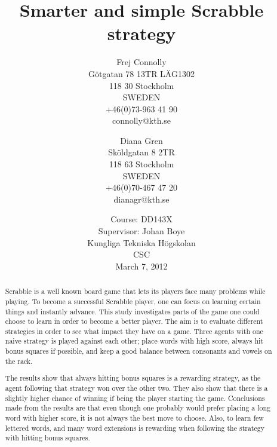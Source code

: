 \documentclass[a4paper, 12pt]{report}
\begin{document}
\graphicspath{{./images/}}
\title{Smarter and simple Scrabble strategy}
\date{Course: DD143X \\ Supervisor: Johan Boye \\ Kungliga Tekniska Högskolan \\ CSC \\ March 7, 2012}
\author{Frej Connolly \\ Götgatan 78 13TR LÄG1302 \\ 118 30 Stockholm \\ SWEDEN \\ +46(0)73-963 41 90 \\ connolly@kth.se \\
        \and Diana Gren \\ Sköldgatan 8 2TR \\ 118 63 Stockholm \\ SWEDEN \\ +46(0)70-467 47 20 \\ dianagr@kth.se}

\maketitle
\begin{abstract}
Scrabble is a well known board game that lets its players face many problems while playing. To become a successful Scrabble player, one can focus on learning certain things and instantly advance. This study investigates parts of the game one could choose to learn in order to become a better player. The aim is to evaluate different strategies in order to see what impact they have on a game. Three agents with one naive strategy is played against each other; place words with high score, always hit bonus squares if possible, and keep a good balance between consonants and vowels on the rack. 

The results show that always hitting bonus squares is a rewarding strategy, as the agent following that strategy won over the other two. They also show that there is a slightly higher chance of winning if being the player starting the game. Conclusions made from the results are that even though one probably would prefer placing a long word with higher score, it is not always the best move to choose. Also, to learn few lettered words, and many word extensions is rewarding when following the strategy with hitting bonus squares.
\end{abstract}
\end{document}

